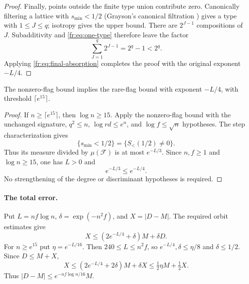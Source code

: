 \begin{proof}
Finally, points outside the finite type union contribute zero. Canonically filtering a lattice with $s_{\min}<1/2$ (Grayson's canonical filtration \cite[Theorem 1.18 and Definition 1.19, p. 609]{r3grayson}) gives a type with $1\le J\le q$; isotropy gives the upper bound. There are $2^{J-1}$ compositions of $J$. Subadditivity and \eqref{fr:eq:one-type} therefore leave the factor
\[
 \sum_{J=1}^q2^{J-1}=2^q-1<2^q.
\]
Applying \eqref{fr:eq:final-absorption} completes the proof with the original exponent $-L/4$.
\end{proof}

\begin{proposition}\label{fr:prop:rare-flags}
The nonzero-flag bound implies the rare-flag bound with exponent $-L/4$, with threshold $\lceil e^{15}\rceil$.
\end{proposition}

\begin{proof}
If $n\ge\lceil e^{15}\rceil$, then $\log n\ge15$. Apply the nonzero-flag bound with the unchanged signature, $q^2\le n$, $\log rd\le e^n$, and $\log f\le\sqrt n$ hypotheses. The step characterization gives
\[
 \{s_{\min}<1/2\}=\{S_{<}(1/2)\ne0\}.
\]
Thus its measure divided by $\mu(\mathcal F)$ is at most $e^{-L/3}$. Since $n,f\ge1$ and $\log n\ge15$, one has $L>0$ and
\[
 e^{-L/3}\le e^{-L/4}.
\]
No strengthening of the degree or discriminant hypotheses is required.
\end{proof}

\paragraph{The total error.}
Put $L=nf\log n$, $\delta=\exp(-n^2f)$, and $X=|D-M|$.
The required orbit estimates give
\[
 X\le (2e^{-L/4}+\delta)M+\delta D .
\]
For $n\ge e^{15}$ put $\eta=e^{-L/16}$. Then $240\le L\le n^2f$,
so $e^{-L/4},\delta\le\eta/8$ and $\delta\le1/2$. Since $D\le M+X$,
\[
 X\le (2e^{-L/4}+2\delta)M+\delta X
   \le \tfrac12\eta M+\tfrac12X .
\]
Thus $|D-M|\le e^{-nf\log n/16}M$.
